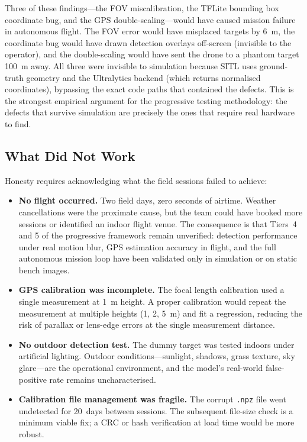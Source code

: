 Three of these findings---the FOV miscalibration, the TFLite bounding box coordinate bug, and the GPS double-scaling---would have caused mission failure in autonomous flight.  The FOV error would have misplaced targets by \SI{6}{\metre}, the coordinate bug would have drawn detection overlays off-screen (invisible to the operator), and the double-scaling would have sent the drone to a phantom target \SI{100}{\metre} away.  All three were invisible to simulation because SITL uses ground-truth geometry and the Ultralytics backend (which returns normalised coordinates), bypassing the exact code paths that contained the defects.  This is the strongest empirical argument for the progressive testing methodology: the defects that survive simulation are precisely the ones that require real hardware to find.

\subsection{What Did Not Work}\label{sec:field-not-work}

Honesty requires acknowledging what the field sessions failed to achieve:

\begin{itemize}
    \item \textbf{No flight occurred.}  Two field days, zero seconds of airtime.  Weather cancellations were the proximate cause, but the team could have booked more sessions or identified an indoor flight venue.  The consequence is that Tiers~4 and 5 of the progressive framework remain unverified: detection performance under real motion blur, GPS estimation accuracy in flight, and the full autonomous mission loop have been validated only in simulation or on static bench images.
    \item \textbf{GPS calibration was incomplete.}  The focal length calibration used a single measurement at \SI{1}{\metre} height.  A proper calibration would repeat the measurement at multiple heights (1, 2, 5~m) and fit a regression, reducing the risk of parallax or lens-edge errors at the single measurement distance.
    \item \textbf{No outdoor detection test.}  The dummy target was tested indoors under artificial lighting.  Outdoor conditions---sunlight, shadows, grass texture, sky glare---are the operational environment, and the model's real-world false-positive rate remains uncharacterised.
    \item \textbf{Calibration file management was fragile.}  The corrupt \texttt{.npz} file went undetected for 20~days between sessions.  The subsequent file-size check is a minimum viable fix; a CRC or hash verification at load time would be more robust.
\end{itemize}

